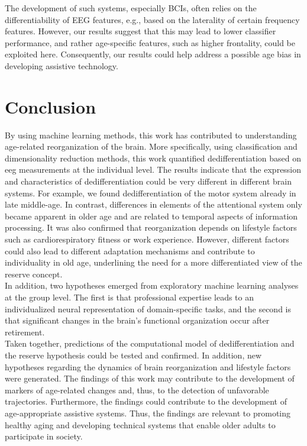 The development of such systems, especially BCIs, often relies on the differentiability of EEG features, e.g., based on the laterality of certain frequency features. However, our results suggest that this may lead to lower classifier performance, and rather age-specific features, such as higher frontality, could be exploited here. Consequently, our results could help address a possible age bias in developing assistive technology.

\section{Conclusion}
By using machine learning methods, this work has contributed to understanding age-related reorganization of the brain. More specifically, using classification and dimensionality reduction methods, this work quantified dedifferentiation based on \gls{eeg} measurements at the individual level. The results indicate that the expression and characteristics of dedifferentiation could be very different in different brain systems. For example, we found dedifferentiation of the motor system already in late middle-age. In contrast, differences in elements of the attentional system only became apparent in older age and are related to temporal aspects of information processing. It was also confirmed that reorganization depends on lifestyle factors such as cardiorespiratory fitness or work experience. However, different factors could also lead to different adaptation mechanisms and contribute to individuality in old age, underlining the need for a more differentiated view of the reserve concept.\\
In addition, two hypotheses emerged from exploratory machine learning analyses at the group level. The first is that professional expertise leads to an individualized neural representation of domain-specific tasks, and the second is that significant changes in the brain's functional organization occur after retirement.\\
Taken together, predictions of the computational model of dedifferentiation and the reserve hypothesis could be tested and confirmed. In addition, new hypotheses regarding the dynamics of brain reorganization and lifestyle factors were generated. The findings of this work may contribute to the development of markers of age-related changes and, thus, to the detection of unfavorable trajectories. Furthermore, the findings could contribute to the development of age-appropriate assistive systems. Thus, the findings are relevant to promoting healthy aging and developing technical systems that enable older adults to participate in society.




